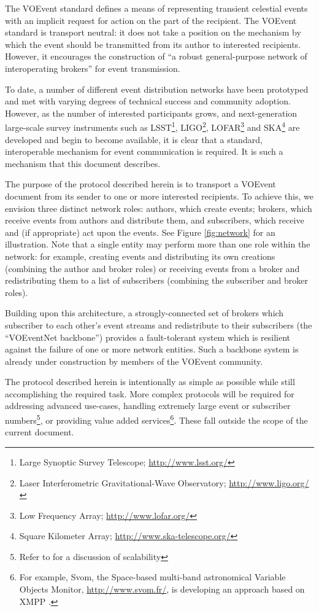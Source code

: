 \documentclass[a4paper,11pt]{ivoa}
\begin{document}
The VOEvent standard \citep{std:VOEVENT2} defines a means of representing
transient celestial events with an implicit request for action on the part of
the recipient. The VOEvent standard is transport neutral: it does not take a
position on the mechanism by which the event should be transmitted from its
author to interested recipients. However, it encourages the construction of
``a robust general-purpose network of interoperating brokers'' for event
transmission.

To date, a number of different event distribution networks have been
prototyped and met with varying degrees of technical success and community
adoption. However, as the number of interested participants grows, and
next-generation large-scale survey instruments such as LSST\footnote{Large
Synoptic Survey Telescope; \url{http://www.lsst.org/}}, LIGO\footnote{Laser
Interferometric Gravitational-Wave Observatory; \url{http://www.ligo.org/}},
LOFAR\footnote{Low Frequency Array; \url{http://www.lofar.org/}} and
SKA\footnote{Square Kilometer Array; \url{http://www.ska-telescope.org/}} are
developed and begin to become available, it is clear that a standard,
interoperable mechanism for event communication is required. It is such a
mechanism that this document describes.

The purpose of the protocol described herein is to transport a VOEvent
document from its sender to one or more interested recipients. To achieve
this, we envision three distinct network roles: authors, which create events;
brokers, which receive events from authors and distribute them, and
subscribers, which receive and (if appropriate) act upon the events. See
Figure \ref{fig:network} for an illustration. Note that a single entity may
perform more than one role within the network: for example, creating events
and distributing its own creations (combining the author and broker roles) or
receiving events from a broker and redistributing them to a list of
subscribers (combining the subscriber and broker roles).

Building upon this architecture, a strongly-connected set of brokers which
subscriber to each other's event streams and redistribute to their subscribers
(the ``VOEventNet backbone'') provides a fault-tolerant system which is
resilient against the failure of one or more network entities. Such a backbone
system is already under construction by members of the VOEvent community.

The protocol described herein is intentionally as simple as possible while
still accomplishing the required task. More complex protocols will be required
for addressing advanced use-cases, handling extremely large event or
subscriber numbers\footnote{Refer to \citet{Swinbank:2014} for a discussion of
scalability}, or providing value added services\footnote{For example, Svom,
the Space-based multi-band astronomical Variable Objects Monitor,
\url{http://www.svom.fr/}, is developing an approach based on XMPP
\citep{SaintAndre:2011}.}. These fall outside the scope of the current
document.
\end{document}
